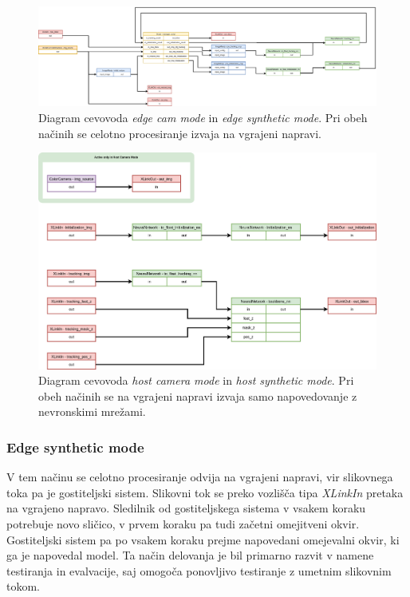 \documentclass[a4paper,12pt,openright]{book}
\begin{document}
\begin{figure}[htb]
    \begin{center}
        \includegraphics[width=1\textwidth]{img/edge.png}
    \end{center}
    \caption{Diagram cevovoda \emph{edge cam mode} in \emph{edge synthetic mode}. Pri obeh načinih se celotno procesiranje izvaja na vgrajeni napravi.}
    \label{img:edge}
\end{figure}

\begin{figure}[htb]
    \begin{center}
        \includegraphics[width=1\textwidth]{img/host.png}
    \end{center}
    \caption{Diagram cevovoda \emph{host camera mode} in \emph{host synthetic mode}. Pri obeh načinih se na vgrajeni napravi izvaja samo napovedovanje z nevronskimi mrežami.}
    \label{img:host}
\end{figure}

\subsubsection{Edge synthetic mode}
\label{sec:edge_synth}
V tem načinu se celotno procesiranje odvija na vgrajeni napravi, vir slikovnega toka pa je gostiteljski sistem. Slikovni tok se preko vozlišča tipa \emph{XLinkIn} pretaka na vgrajeno napravo. Sledilnik od gostiteljskega sistema v vsakem koraku potrebuje novo sličico, v prvem koraku pa tudi začetni omejitveni okvir. Gostiteljski sistem pa po vsakem koraku prejme napovedani omejevalni okvir, ki ga je napovedal model. Ta način delovanja je bil primarno razvit v namene testiranja in evalvacije, saj omogoča ponovljivo testiranje z umetnim slikovnim tokom.
\end{document}
